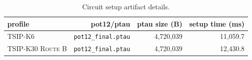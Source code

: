 \begin{table}[t]
\centering
\caption{Circuit setup artifact details.}
\label{tab:circuit-setup}
\scriptsize
\setlength{\tabcolsep}{3pt}
\begin{tabular}{@{}l r r r@{}}
\toprule
profile & pot12/ptau & ptau size (B) & setup time (ms) \\
\midrule
\textsc{TSIP-K6} & \texttt{pot12\_final.ptau} & 4,720,039 & 11,059.7 \\
\textsc{TSIP-K30 Route B} & \texttt{pot12\_final.ptau} & 4,720,039 & 12,430.8 \\
\bottomrule
\end{tabular}
\end{table}
